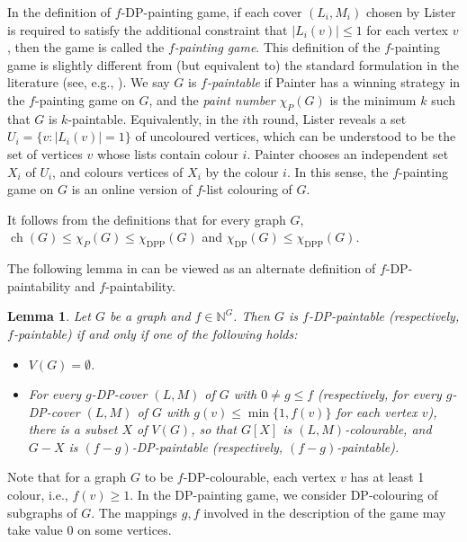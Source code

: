 \documentclass[11pt,a4paper]{article}
\newtheorem{lem}{Lemma}
\theoremstyle{definition}
\begin{document}
In the definition of $f$-DP-painting game, if each cover $(L_i,M_i)$ chosen by Lister is required to satisfy the additional constraint that $|L_i(v)| \le 1$ for each vertex $v$, then the game is called the {\em $f$-painting game}.  This definition of the $f$-painting game is slightly different from (but equivalent to) the standard formulation in the literature (see, e.g., \cite{Schauz}). We say $G$ is {\em $f$-paintable} if Painter has a winning strategy in the $f$-painting game on $G$, and the {\em paint number} $\chi_P(G)$ is the minimum $k$ such that $G$ is $k$-paintable.
Equivalently, in the $i$th round, Lister reveals a set $U_i = \{v: |L_i(v)|=1\}$ of uncoloured vertices, which can be understood to be the set of vertices $v$ whose lists contain colour $i$. Painter chooses an independent set $X_i$ of $U_i$, and colours vertices of $X_i$ by the colour $i$. In this sense, the $f$-painting game on $G$ is an online version of $f$-list colouring of $G$.

  It follows from the definitions that for every graph $G$, $\operatorname{ch}(G) \le \chi_P(G) \le \chi_{\mathrm{DPP}}(G)$ and 
  $\chi_{\mathrm{DP}}(G) \le \chi_{\mathrm{DPP}}(G)$. 
		
The following lemma in \cite{KKLZ2020} can be viewed as an alternate definition of $f$-DP-paintability and $f$-paintability.

 \begin{lem}
 \label{lem-0}
    Let $G$ be a graph and $f \in \mathbb{N}^{G}$.  Then $G$ is $f$-DP-paintable (respectively, $f$-paintable) if and only if one of the following holds:
  \begin{itemize}
  \item[(i)] $V(G)=\emptyset$.
  \item[(ii)] For every $g$-DP-cover $(L,M)$ of $G$ with $0 \ne g \le f$ (respectively, for every $g$-DP-cover $(L,M)$ of $G$ with $g(v) \le \min\{1, f(v)\}$ for each vertex $v$), there is a subset $X$ of $V(G)$, so that $G[X]$ is $(L,M)$-colourable, and $G-X$ is $(f-g)$-DP-paintable (respectively, $(f-g)$-paintable).
  \end{itemize} 
 \end{lem}


 Note that for a graph $G$ to be $f$-DP-colourable, each vertex $v$ has at least 1 colour, i.e., $f(v) \ge 1$. In the DP-painting game, we consider DP-colouring of subgraphs of $G$. The mappings $g,f$ involved in the description of the game may take value $0$ on some vertices.  
\end{document}
